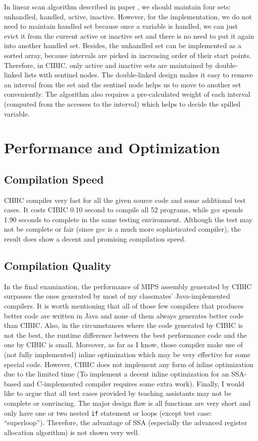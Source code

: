 \documentclass[10pt, a4paper]{article}
\begin{document}
In linear scan algorithm described in paper \cite{moe02}, we should maintain
four sets: unhandled, handled, active, inactive. However, for the
implementation, we do not need to maintain handled set because once a variable
is handled, we can just evict it from the current active or inactive set and
there is no need to put it again into another handled set. Besides, the
unhandled set can be implemented as a sorted array, because intervals are
picked in increasing order of their start points. Therefore, in CIBIC, only
active and inactive sets are maintained by double-linked lists with sentinel
nodes. The double-linked design makes it easy to remove an interval from the
set and the sentinel node helps us to move to another set conveniently. The
algorithm also requires a pre-calculated weight of each interval (computed from
the accesses to the interval) which helps to decide the spilled variable.
\section{Performance and Optimization}
\subsection{Compilation Speed}
CIBIC compiles very fast for all the given source code and some additional test
cases. It costs CIBIC 0.10 second to compile all 52 programs, while gcc spends
1.90 seconds to complete in the same testing environment. Although the test may
not be complete or fair (since gcc is a much more sophisticated compiler), the
result does show a decent and promising compilation speed.
\subsection{Compilation Quality}
In the final examination, the performance of MIPS assembly generated by CIBIC
surpasses the ones generated by most of my classmates' Java-implemented
compilers. It is worth mentioning that all of those few compilers that produces
better code are written in Java and none of them always generates better code
than CIBIC. Also, in the circumstances where the code generated by CIBIC is not
the best, the runtime difference between the best performance code and the one
by CIBIC is small. Moreover, as far as I know, those compiler make use of (not
fully implemented) inline optimization which may be very effective for some
special code. However, CIBIC does not implement any form of inline optimization
due to the limited time (To implement a decent inline optimization for an
SSA-based and C-implemented compiler requires some extra work). Finally, I
would like to argue that all test cases provided by teaching assistants may not
be complete or convincing. The major design flaw is all functions are very
short and only have one or two nested \texttt{if} statement or loops (except
test case: ``superloop''). Therefore, the advantage of SSA (especially the
advanced register allocation algorithm) is not shown very well.
\end{document}
